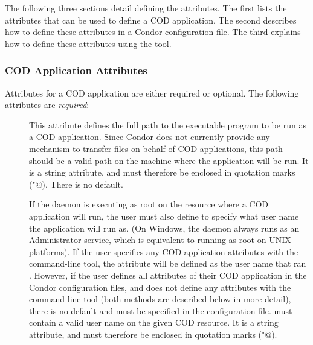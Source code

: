 The following three sections detail defining the attributes.
The first lists the attributes that can be used to define a COD
application.
The second describes how to define these attributes in a Condor
configuration file.
The third explains how to define these attributes using the  tool.


\subsubsection{\label{sec:cod-application-attributes}
COD Application Attributes}


Attributes for a COD application are either required
or optional.
The following attributes are \emph{required}:

\begin{description}

 \item[] This attribute 
   defines the full path to the executable program to be run as a
   COD application.
   Since Condor does not currently provide any mechanism to transfer
   files on behalf of COD applications, this path should be a valid
   path on the machine where the application will be run.
   It is a string attribute, and must therefore be enclosed in
   quotation marks (\verb@"@).
   There is no default.

 \item[] If the  daemon is executing as root on
   the resource where a COD application will run, the user must also
   define  to specify what user name the application will
   run as.
   (On Windows, the  daemon always runs as an Administrator
   service, which is equivalent to running as root on UNIX platforms).
   If the user specifies any COD application attributes with the
    command-line tool, the 
   attribute will be defined as the user name that ran
   .
   However, if the user defines all attributes of their COD
   application in the Condor configuration files, and does not define
   any attributes with the  command-line tool
   (both methods are described below in more detail), there is no
   default and  must be specified in the configuration
   file.
    must contain a valid user
   name on the given COD resource. 
   It is a string attribute, and must therefore be enclosed in 
   quotation marks (\verb@"@).

\end{description}

